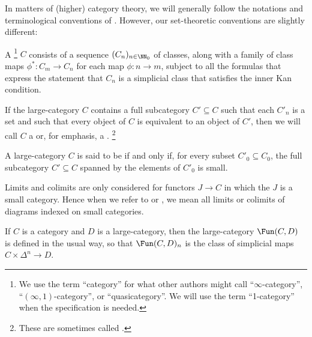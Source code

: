 In matters of (higher) category theory,
we will generally follow the notations and terminological conventions
of \cite{Lurie2009}.
However, our set-theoretic conventions are slightly different:
\begin{definition}
	A %
	\footnote{We use the term \enquote{category}
		for what other authors might call
		\enquote{$ \infty $-category},
		\enquote{$(\infty,1)$-category}, or
		\enquote{quasicategory}.
		We will use the term \enquote{1-category}
	when the specification is needed.}
	$C$ consists of a sequence $(C_n)_{n\in\NN_0}$ of classes,
	along with a family of class maps $ \phi^{\ast} \colon C_m \to C_n $
	for each map $ \phi \colon n \to m $,
	subject to all the formulas that express the statement that $C_n$ is a simplicial class
	that satisfies the inner Kan condition.

	If the large-category $C$ contains a full subcategory $ C' \subseteq C $
	such that each $ C'_n $ is a set and
	such that every object of $ C $ is equivalent to an object of $ C' $,
	then we will call $ C $ a 
	or, for emphasis, a .%
	\footnote{These are sometimes called .}
	
	A large-category $ C $ is said to be  if and only if,
	for every subset $ C'_0 \subseteq C_0$,
	the full subcategory $ C' \subseteq C $ spanned by the elements of $ C'_0 $ is small.
	
	Limits and colimits are only considered for functors $ J \to C $ in which
	the $ J $ is a small category.
	Hence when we refer to  or ,
	we mean all limits or colimits of diagrams indexed on small categories.
	
	If $ C $ is a category and $ D $ is a large-category, 
	then the large-category $ \Fun(C, D) $ is defined in the usual way,
	so that $ \Fun(C, D)_n $ is the class of simplicial maps
	$ C \times \Delta^n \to D $.
\end{definition}

